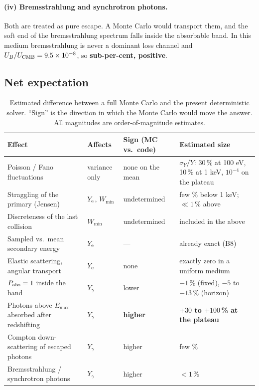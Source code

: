 \documentclass[11pt,a4paper]{article}
\begin{document}
\paragraph{(iv) Bremsstrahlung and synchrotron photons.}  Both are treated as
pure escape.  A Monte Carlo would transport them, and the soft end of the
bremsstrahlung spectrum falls inside the absorbable band.  In this medium
bremsstrahlung is never a dominant loss channel and $U_B/U_{\rm CMB}=9.5\times
10^{-8}$, so \textbf{sub-per-cent, positive}.

\subsection{Net expectation}

\begin{table}[h]
\centering
\caption{Estimated difference between a full Monte Carlo and the present
deterministic solver.  ``Sign'' is the direction in which the Monte Carlo would
move the answer.  All magnitudes are order-of-magnitude estimates.}
\label{tab:mc}
\small
\begin{tabular}{p{6.6cm}p{2.4cm}p{2.0cm}p{3.4cm}}
\toprule
Effect & Affects & Sign (MC vs.\ code) & Estimated size \\
\midrule
Poisson / Fano fluctuations                 & variance only & none on the mean & $\sigma_Y/Y$: 30\,\% at 100 eV, 10\,\% at 1 keV, $10^{-4}$ on the plateau \\
Straggling of the primary (Jensen)          & $Y_{\rm e}$, $W_{\min}$ & undetermined & few \% below 1 keV; $\ll1$\,\% above \\
Discreteness of the last collision          & $W_{\min}$ & undetermined & included in the above \\
Sampled vs.\ mean secondary energy          & $Y_{\rm e}$ & --- & already exact (B8) \\
Elastic scattering, angular transport       & $Y_{\rm e}$ & none & exactly zero in a uniform medium \\
$P_{\rm abs}=1$ inside the band             & $Y_\gamma$ & lower & $-1$\,\% (fixed), $-5$ to $-13$\,\% (horizon) \\
Photons above $E_{\max}$ absorbed after redshifting & $Y_\gamma$ & \textbf{higher} & \textbf{$+30$ to $+100$\,\% at the plateau} \\
Compton down-scattering of escaped photons  & $Y_\gamma$ & higher & few \% \\
Bremsstrahlung / synchrotron photons        & $Y_\gamma$ & higher & $<1$\,\% \\
\bottomrule
\end{tabular}
\end{table}
\end{document}
